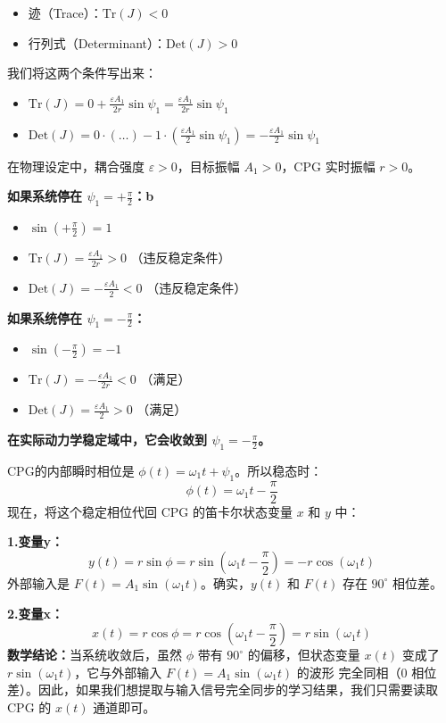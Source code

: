 \documentclass[12pt, a4paper]{ctexart}
\begin{document}
\begin{itemize}
    \item 迹（Trace）：$\text{Tr}(J) < 0$
    \item 行列式（Determinant）：$\text{Det}(J) > 0$
\end{itemize}
我们将这两个条件写出来：
\begin{itemize}
    \item $\text{Tr}(J) = 0 + \frac{\varepsilon A_1}{2r} \sin\psi_1 = \frac{\varepsilon A_1}{2r} \sin\psi_1$
    \item $\text{Det}(J) = 0 \cdot (\dots) - 1 \cdot \left(\frac{\varepsilon A_1}{2} \sin\psi_1\right) = -\frac{\varepsilon A_1}{2} \sin\psi_1$
\end{itemize}


在物理设定中，耦合强度 $\varepsilon > 0$，目标振幅 $A_1 > 0$，CPG 实时振幅 $r > 0$。

\textbf{如果系统停在 $\psi_1 = +\frac{\pi}{2}$：b}
\begin{itemize}
    \item $\sin(+\frac{\pi}{2}) = 1$
    \item $\text{Tr}(J) = \frac{\varepsilon A_1}{2r} > 0$ （违反稳定条件）
    \item $\text{Det}(J) = -\frac{\varepsilon A_1}{2} < 0$ （违反稳定条件）
\end{itemize}
\textbf{如果系统停在 $\psi_1 = -\frac{\pi}{2}$：}
\begin{itemize}
    \item $\sin(-\frac{\pi}{2}) = -1$
    \item $\text{Tr}(J) = -\frac{\varepsilon A_1}{2r} < 0$ （满足）
    \item $\text{Det}(J) = \frac{\varepsilon A_1}{2} > 0$ （满足）
\end{itemize}

\textbf{在实际动力学稳定域中，它会收敛到 $\psi_1 = -\frac{\pi}{2}$。}

CPG的内部瞬时相位是 $\phi(t) = \omega_1 t + \psi_1$。所以稳态时：$$\phi(t) = \omega_1 t - \frac{\pi}{2}$$现在，将这个稳定相位代回 CPG 的笛卡尔状态变量 $x$ 和 $y$ 中：

\textbf{1.变量{y}：}$$y(t) = r \sin\phi = r \sin\left(\omega_1 t - \frac{\pi}{2}\right) = -r \cos(\omega_1 t)$$外部输入是 $F(t) = A_1 \sin(\omega_1 t)$。确实，$y(t)$ 和 $F(t)$ 存在 $90^\circ$ 相位差。

\textbf{2.变量{x}：}$$x(t) = r \cos\phi = r \cos\left(\omega_1 t - \frac{\pi}{2}\right) = r \sin(\omega_1 t)$$
\textbf{数学结论：}当系统收敛后，虽然 $\phi$ 带有 $90^\circ$ 的偏移，但状态变量 $x(t)$ 变成了 $r \sin(\omega_1 t)$，它与外部输入 $F(t) = A_1 \sin(\omega_1 t)$ 的波形 完全同相（0 相位差）。因此，如果我们想提取与输入信号完全同步的学习结果，我们只需要读取 CPG 的 $x(t)$ 通道即可。
\end{document}
